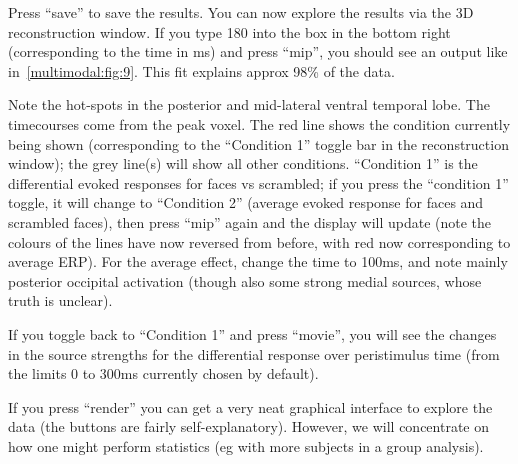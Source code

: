 Press ``save'' to save the results. You can now explore the results via the 3D reconstruction window. If you type 180 into the box in the bottom right (corresponding to the time in ms) and press ``mip'', you should see an output like in~\ref{multimodal:fig:9}. This fit explains approx 98\% of the data.

Note the hot-spots in the posterior and mid-lateral ventral temporal lobe. The timecourses come from the peak voxel. The red line shows the condition currently being shown (corresponding to the ``Condition 1'' toggle bar in the reconstruction window); the grey line(s) will show all other conditions. ``Condition 1'' is the differential evoked responses for faces vs scrambled; if you press the ``condition 1'' toggle, it will change to ``Condition 2'' (average evoked response for faces and scrambled faces), then press ``mip'' again and the display will update (note the colours of the lines have now reversed from before, with red now corresponding to average ERP). For the average effect, change the time to 100ms, and note mainly posterior occipital activation (though also some strong medial sources, whose truth is unclear).

If you toggle back to ``Condition 1'' and press ``movie'', you will see the changes in the source strengths for the differential response over peristimulus time (from the limits 0 to 300ms currently chosen by default).

If you press ``render'' you can get a very neat graphical interface to explore the data (the buttons are fairly self-explanatory). However, we will concentrate on how one might perform statistics (eg with more subjects in a group analysis).

